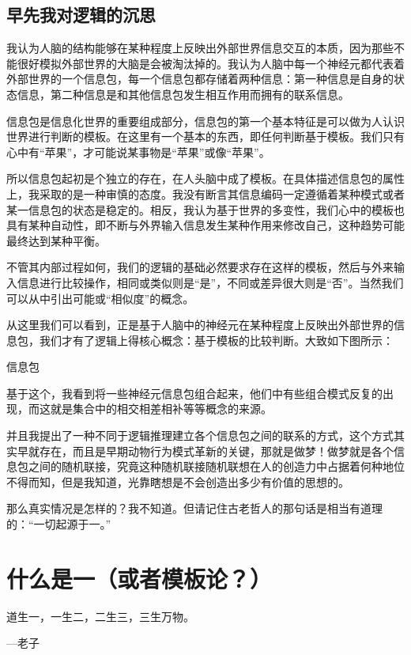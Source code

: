 \documentclass[12pt]{exam}%
\begin{document}
\subsection{早先我对逻辑的沉思}
我认为人脑的结构能够在某种程度上反映出外部世界信息交互的本质，因为那些不能很好模拟外部世界的大脑是会被淘汰掉的。我认为人脑中每一个神经元都代表着外部世界的一个信息包，每一个信息包都存储着两种信息：第一种信息是自身的状态信息，第二种信息是和其他信息包发生相互作用而拥有的联系信息。

信息包是信息化世界的重要组成部分，信息包的第一个基本特征是可以做为人认识世界进行判断的模板。在这里有一个基本的东西，即任何判断基于模板。我们只有心中有“苹果”，才可能说某事物是“苹果”或像“苹果”。

所以信息包起初是个独立的存在，在人头脑中成了模板。在具体描述信息包的属性上，我采取的是一种审慎的态度。我没有断言其信息编码一定遵循着某种模式或者某一信息包的状态是稳定的。相反，我认为基于世界的多变性，我们心中的模板也具有某种自动性，即不断与外界输入信息发生某种作用来修改自己，这种趋势可能最终达到某种平衡。

不管其内部过程如何，我们的逻辑的基础必然要求存在这样的模板，然后与外来输入信息进行比较操作，相同或类似则是“是”，不同或差异很大则是“否”。当然我们可以从中引出可能或“相似度”的概念。

从这里我们可以看到，正是基于人脑中的神经元在某种程度上反映出外部世界的信息包，我们才有了逻辑上得核心概念：基于模板的比较判断。大致如下图所示：
\begin{fig}[0.8]{信息包}
\caption{信息包}
\label{fig:信息包}
\end{fig}

基于这个，我看到将一些神经元信息包组合起来，他们中有些组合模式反复的出现，而这就是集合中的相交相差相补等等概念的来源。

并且我提出了一种不同于逻辑推理建立各个信息包之间的联系的方式，这个方式其实早就存在，而且是早期动物行为模式革新的关键，那就是做梦！做梦就是各个信息包之间的随机联接，究竟这种随机联接随机联想在人的创造力中占据着何种地位不得而知，但是我知道，光靠瞎想是不会创造出多少有价值的思想的。

那么真实情况是怎样的？我不知道。但请记住古老哲人的那句话是相当有道理的：“一切起源于一。”

\section{什么是一（或者模板论？）}
\begin{flushright}
\begin{notecard}[blue!30]{10em}
\ttfamily
道生一，一生二，二生三，三生万物。

{\vspace{-10pt}\hfill\sffamily —老子}
\end{notecard}
\end{flushright}
\end{document}
